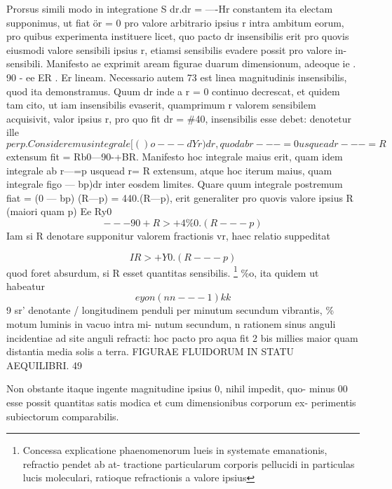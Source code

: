 \documentclass[12pt,a4paper]{article}
\begin{document}
Prorsus simili modo in integratione S dr.dr = ----Hr constantem ita electam
supponimus, ut fiat ör = 0 pro valore arbitrario ipsius r intra ambitum eorum,
pro quibus experimenta instituere licet, quo pacto dr insensibilis erit pro quovis
eiusmodi valore sensibili ipsius r, etiamsi sensibilis evadere possit pro valore in-
sensibili. Manifesto ae exprimit aream figurae duarum dimensionum, adeoque
ie                       .         90      -          ee             ER           .
Er lineam.      Necessario autem 73 est linea magnitudinis insensibilis, quod ita
demonstramus.          Quum       dr inde a r = 0 continuo decrescat, et quidem tam
cito, ut iam insensibilis evaserit, quamprimum r valorem sensibilem acquisivit,
valor ipsius r, pro quo fit dr = \#40, insensibilis esse debet: denotetur ille
\[per p. Consideremus integrale                   [()o---dYr)dr, quodab                r---=0 usquead                r---=R\]
extensum fit = Rb0---90-+BR.    Manifesto hoc integrale maius erit, quam idem
integrale ab  r---=p usquead r= R extensum, atque hoc iterum maius, quam
integrale figo --- bp)dr inter eosdem limites.                         Quare quum integrale postremum
fiat = (0 --- bp) (R---p) = 440.(R---p),                             erit generaliter pro quovis valore ipsius
R (maiori quam p)                                                   Ee
Ry0
\[                                    --- 90 + R>+4\%0.(R---p)\]
Iam si R denotare supponitur valorem fractionis vr, haec relatio suppeditat

\[                                            IR>+Y0.(R---p)\]
quod foret absurdum, si R esset quantitas sensibilis.
\footnote{Concessa   explicatione phaenomenorum      lueis in systemate    emanationis,    refractio   pendet ab at- tractione particularum corporis pellucidi in particulas lucis moleculari,    ratioque refractionis a valore ipsius}
\%o, ita quidem ut habeatur
\[                                                eyo n (nn---1)kk\]
9       sr'
denotante   / longitudinem penduli per minutum secundum vibrantis,          \% motum luminis in vacuo intra mi-
nutum secundum,      n rationem   sinus   anguli incidentiae    ad site anguli refracti:       hoc pacto pro aqua fit
2 bis millies maior quam distantia media solis a terra.
FIGURAE FLUIDORUM IN STATU AEQUILIBRI.                     49

Non obstante itaque ingente magnitudine ipsius        0,   nihil impedit, quo-
minus 00 esse possit quantitas satis modica et cum dimensionibus corporum ex-
perimentis subiectorum comparabilis.
\end{document}
